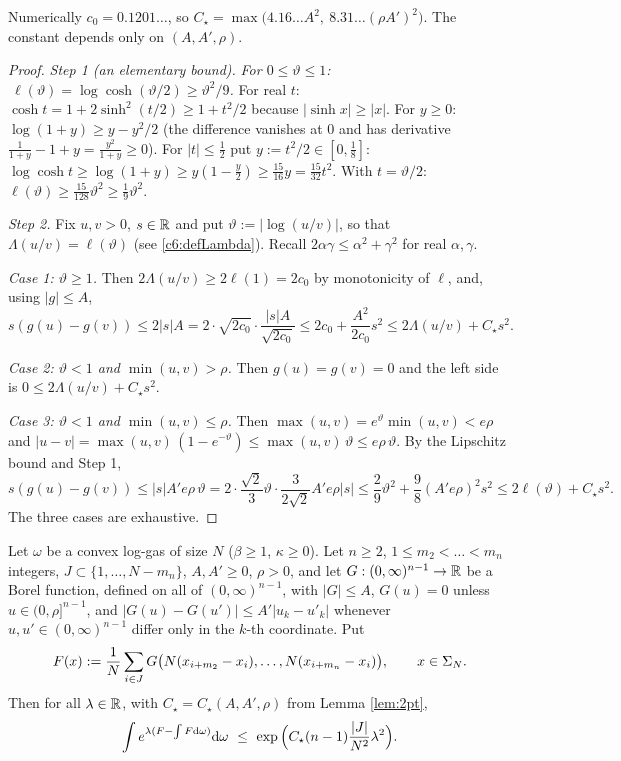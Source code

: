 \noindent Numerically $c_0=0.1201\ldots$, so $C_\star=\max\big(4.16\ldots A^2,\ 8.31\ldots(\rho A')^2\big)$. The constant depends only on $(A,A',\rho)$.

\begin{proof}
\emph{Step 1 (an elementary bound).} \emph{For $0\le\vartheta\le1$: $\ \ell(\vartheta)=\log\cosh(\vartheta/2)\ge\vartheta^2/9$.}
For real $t$: $\cosh t=1+2\sinh^2(t/2)\ge1+t^2/2$ because $|\sinh x|\ge|x|$. For $y\ge0$: $\log(1+y)\ge y-y^2/2$ (the difference vanishes at $0$ and has derivative $\frac1{1+y}-1+y=\frac{y^2}{1+y}\ge0$).
For $|t|\le\frac12$ put $y:=t^2/2\in[0,\frac18]$: $\log\cosh t\ge\log(1+y)\ge y(1-\frac y2)\ge\frac{15}{16}y=\frac{15}{32}t^2$.
With $t=\vartheta/2$: $\ell(\vartheta)\ge\frac{15}{128}\vartheta^2\ge\frac19\vartheta^2$.

\emph{Step 2.} Fix $u,v>0$, $s\in\mathbb{R}$ and put $\vartheta:=|\log(u/v)|$, so that $\Lambda(u/v)=\ell(\vartheta)$ (see \eqref{c6:defLambda}). Recall $2\alpha\gamma\le\alpha^2+\gamma^2$ for real $\alpha,\gamma$.

\emph{Case 1: $\vartheta\ge1$.} Then $2\Lambda(u/v)\ge2\ell(1)=2c_0$ by monotonicity of $\ell$, and, using $|g|\le A$,
\[s(g(u)-g(v))\le2|s|A=2\cdot\sqrt{2c_0}\cdot\frac{|s|A}{\sqrt{2c_0}}\le2c_0+\frac{A^2}{2c_0}s^2\le2\Lambda(u/v)+C_\star s^2 .\]

\emph{Case 2: $\vartheta<1$ and $\min(u,v)>\rho$.} Then $g(u)=g(v)=0$ and the left side is $0\le2\Lambda(u/v)+C_\star s^2$.

\emph{Case 3: $\vartheta<1$ and $\min(u,v)\le\rho$.} Then $\max(u,v)=e^{\vartheta}\min(u,v)<e\rho$ and
$|u-v|=\max(u,v)\,(1-e^{-\vartheta})\le\max(u,v)\,\vartheta\le e\rho\,\vartheta$. By the Lipschitz bound and Step 1,
\[s(g(u)-g(v))\le|s|A'e\rho\,\vartheta=2\cdot\frac{\sqrt2}3\vartheta\cdot\frac{3}{2\sqrt2}A'e\rho|s|\le\frac29\vartheta^2+\frac98(A'e\rho)^2s^2\le2\ell(\vartheta)+C_\star s^2 .\]
The three cases are exhaustive.
\end{proof}

\begin{theorem}\label{thm:conc}
Let $\omega$ be a convex log-gas of size $N$ ($\beta\ge1$, $\kappa\ge0$). Let $n\ge2$, $1\le m_2<\dots<m_n$ integers, $J\subset\{1,\dots,N-m_n\}$, $A,A'\ge0$, $\rho>0$, and let
$G:(0,\infty)^{n-1}\to\mathbb{R}$ be a Borel function, defined on all of $(0,\infty)^{n-1}$, with $|G|\le A$, $G(u)=0$ unless $u\in(0,\rho]^{n-1}$, and $|G(u)-G(u')|\le A'|u_k-u'_k|$ whenever $u,u'\in(0,\infty)^{n-1}$ differ only in the $k$-th coordinate. Put
\begin{equation}\label{defF}
F(x):=\frac1N\sum_{i\in J}G\big(N(x_{i+m_2}-x_i),\dots,N(x_{i+m_n}-x_i)\big),\qquad x\in\Sigma_N .
\end{equation}
Then for all $\lambda\in\mathbb{R}$, with $C_\star=C_\star(A,A',\rho)$ from Lemma \ref{lem:2pt},
\begin{equation}\label{conc}
\int e^{\lambda(F-\int F\rd\omega)}\rd\omega\ \le\ \exp\Big(C_\star(n-1)\frac{|J|}{N^2}\lambda^2\Big).
\end{equation}
\end{theorem}

